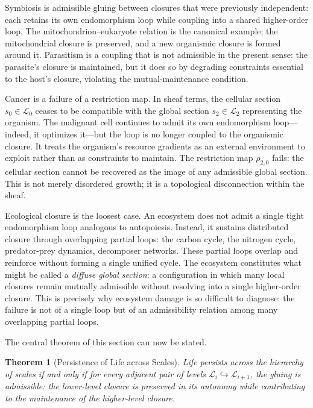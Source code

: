 \documentclass[11pt, a4paper]{article}
\theoremstyle{plain}
\newtheorem{theorem}{Theorem}[section]
\theoremstyle{definition}
\theoremstyle{remark}
\newcommand{\CL}{\mathcal{L}}
\begin{document}
Symbiosis is admissible gluing between closures that were previously independent: each retains its own endomorphism loop while coupling into a shared higher-order loop. The mitochondrion--eukaryote relation is the canonical example; the mitochondrial closure is preserved, and a new organismic closure is formed around it. Parasitism is a coupling that is not admissible in the present sense: the parasite's closure is maintained, but it does so by degrading constraints essential to the host's closure, violating the mutual-maintenance condition.

Cancer is a failure of a restriction map. In sheaf terms, the cellular section $s_0 \in \CL_0$ ceases to be compatible with the global section $s_2 \in \CL_2$ representing the organism. The malignant cell continues to admit its own endomorphism loop---indeed, it optimizes it---but the loop is no longer coupled to the organismic closure. It treats the organism's resource gradients as an external environment to exploit rather than as constraints to maintain. The restriction map $\rho_{2,0}$ fails: the cellular section cannot be recovered as the image of any admissible global section. This is not merely disordered growth; it is a topological disconnection within the sheaf.

Ecological closure is the loosest case. An ecosystem does not admit a single tight endomorphism loop analogous to autopoiesis. Instead, it sustains distributed closure through overlapping partial loops: the carbon cycle, the nitrogen cycle, predator-prey dynamics, decomposer networks. These partial loops overlap and reinforce without forming a single unified cycle. The ecosystem constitutes what might be called a \emph{diffuse global section}: a configuration in which many local closures remain mutually admissible without resolving into a single higher-order closure. This is precisely why ecosystem damage is so difficult to diagnose: the failure is not of a single loop but of an admissibility relation among many overlapping partial loops.

The central theorem of this section can now be stated.

\begin{theorem}[Persistence of Life across Scales]
Life persists across the hierarchy of scales if and only if for every adjacent pair of levels $\CL_i \hookrightarrow \CL_{i+1}$, the gluing is admissible: the lower-level closure is preserved in its autonomy while contributing to the maintenance of the higher-level closure.
\end{theorem}
\end{document}
